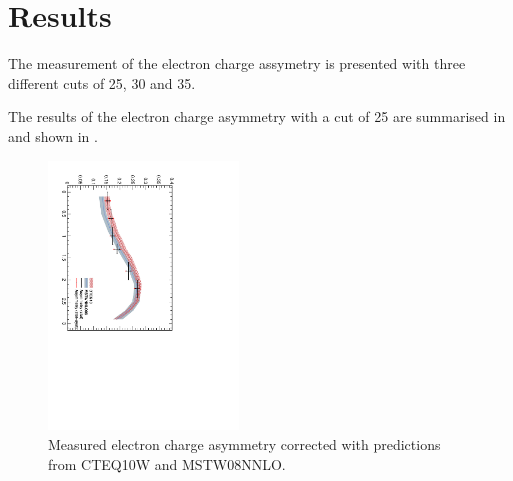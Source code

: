 \section{Results}
The measurement of the electron charge assymetry is presented with three
different \pT cuts of 25, 30 and \unit{35}{\GeV}. 

The results of the electron charge asymmetry with a \pT cut of \unit{25}{\GeV}
are summarised in  and shown in
.

\begin{figure}[htbp]
  \begin{center}
  \includegraphics*[width=0.45\textwidth,angle=90]{Asym_25}
  \caption{\label{fig:asym25} Measured electron charge asymmetry corrected with predictions from CTEQ10W and MSTW08NNLO.}
  \end{center}
\end{figure}

